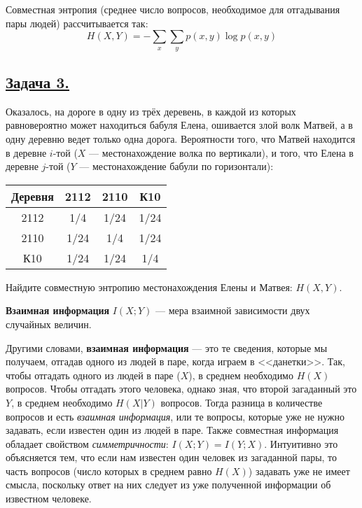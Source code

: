 Совместная энтропия (среднее число вопросов, необходимое для отгадывания пары людей) рассчитывается так:
\[H(X, Y)=-\sum\limits_{x}\sum\limits_{y} p(x, y)\log p(x ,y) \]

\subsection*{\hyperref[sec:sol_problem3]{Задача 3.}}\label{sec:problem3} Оказалось, на дороге в одну из трёх деревень, в каждой из которых равновероятно может находиться бабуля Елена, ошивается злой волк Матвей, а в одну деревню ведет только одна дорога. Вероятности того, что Матвей находится в деревне $i$-той ($X$ --- местонахождение волка по вертикали), и того, что Елена в деревне $j$-той ($Y$ --- местонахождение бабули по горизонтали):
\begin{center}
    \begin{tabular}{c||c|c|c}
        Деревня & 2112 & 2110 & К10 \\
        \hline
        \hline
        2112 & 1/4 & 1/24 & 1/24 \\
        \hline
        2110 & 1/24 & 1/4 & 1/24 \\
        \hline
        К10 & 1/24 & 1/24 & 1/4 \\
    \end{tabular}
\end{center}

Найдите совместную энтропию местонахождения Елены и Матвея: $H(X, Y)$. \\


\begin{siderules}
    \textbf{Взаимная информация} $I(X; Y)$ --- мера взаимной зависимости двух случайных величин.
\end{siderules}

Другими словами, \textbf{взаимная информация} --- это те сведения, которые мы получаем, отгадав одного из людей в паре, когда играем в <<данетки>>. Так, чтобы отгадать одного из людей в паре ($X$), в среднем необходимо $H(X)$ вопросов. Чтобы отгадать этого человека, однако зная, что второй загаданный это $Y$, в среднем необходимо $H(X|Y)$ вопросов. Тогда разница в количестве вопросов и есть \textit{взаимная информация}, или те вопросы, которые уже не нужно задавать, если известен один из людей в паре. Также совместная информация обладает свойством \textit{симметричности}: $I(X;Y)=I(Y;X)$. Интуитивно это объясняется тем, что если нам известен один человек из загаданной пары, то часть вопросов (число которых в среднем равно $H(X)$) задавать уже не имеет смысла, поскольку ответ на них следует из уже полученной информации об известном человеке. 

